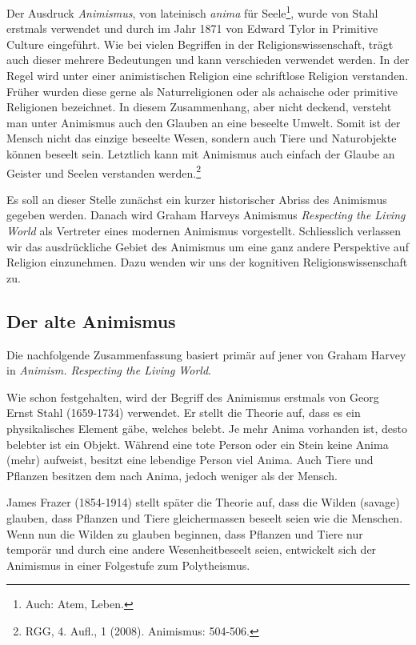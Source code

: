 Der Ausdruck \emph{Animismus}, von lateinisch \emph{anima} für Seele\footnote{Auch: Atem, Leben.}, wurde von Stahl erstmals verwendet und durch im Jahr 1871 von Edward Tylor in Primitive Culture eingeführt. Wie bei vielen Begriffen in der Religionswissenschaft, trägt auch dieser mehrere Bedeutungen und kann verschieden verwendet werden. In der Regel wird unter einer animistischen Religion eine schriftlose Religion verstanden. Früher wurden diese gerne als Naturreligionen oder als achaische oder primitive Religionen bezeichnet. In diesem Zusammenhang, aber nicht deckend, versteht man unter Animismus auch den Glauben an eine beseelte Umwelt. Somit ist der Mensch nicht das einzige beseelte Wesen, sondern auch Tiere und Naturobjekte können beseelt sein. Letztlich kann mit Animismus auch einfach der Glaube an Geister und Seelen verstanden werden.\footnote{RGG, 4. Aufl., 1 (2008). Animismus: 504-506.}

Es soll an dieser Stelle zunächst ein kurzer historischer Abriss des Animismus gegeben werden. Danach wird Graham Harveys Animismus \emph{Respecting the Living World} als Vertreter eines modernen Animismus vorgestellt. Schliesslich verlassen wir das ausdrückliche Gebiet des Animismus um eine ganz andere Perspektive auf Religion einzunehmen. Dazu wenden wir uns der kognitiven Religionswissenschaft zu. 

\subsection{Der alte Animismus}
Die nachfolgende Zusammenfassung basiert primär auf jener von Graham Harvey in \emph{Animism. Respecting the Living World}. 

Wie schon festgehalten, wird der Begriff des Animismus erstmals von Georg Ernst Stahl (1659-1734) verwendet. Er stellt die Theorie auf, dass es ein physikalisches Element gäbe, welches belebt. Je mehr Anima vorhanden ist, desto belebter ist ein Objekt. Während eine tote Person oder ein Stein keine Anima (mehr) aufweist, besitzt eine lebendige Person viel Anima. Auch Tiere und Pflanzen besitzen dem nach Anima, jedoch weniger als der Mensch.

James Frazer (1854-1914) stellt später die Theorie auf, dass die Wilden (savage) glauben, dass Pflanzen und Tiere gleichermassen beseelt seien wie die Menschen. Wenn nun die Wilden zu glauben beginnen, dass Pflanzen und Tiere nur temporär und durch eine andere Wesenheitbeseelt seien, entwickelt sich der Animismus in einer Folgestufe zum Polytheismus.

